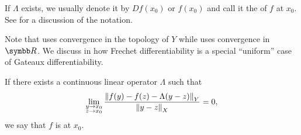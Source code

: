 \begin{definition}
\begin{DefEnum}
    If \( \Lambda \) exists, we usually denote it by \( D f(x_0) \) or \( f(x_0) \) and call it the  of \( f \) at \( x_0 \). See  for a discussion of the notation.

    Note that  uses convergence in the topology of \( Y \) while  uses convergence in \( \BR \). We discuss in  how Frechet differentiability is a special \enquote{uniform} case of Gateaux differentiability.

    If there exists a continuous linear operator \( \Lambda \) such that
    \begin{equation}\label{def:differentiability/strict/condition}
      \lim_{\substack{y \to x_0 \\ z \to x_0}} \frac {\left\Vert f(y) - f(z) - \Lambda (y - z) \right\Vert_Y} {\left\Vert y - z \right\Vert_X} = 0,
    \end{equation}
    we say that \( f \) is  at \( x_0 \).
  \end{DefEnum}
\end{definition}

